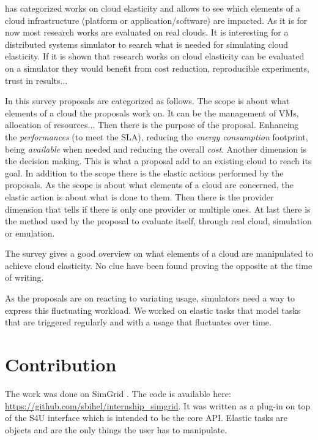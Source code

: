 \documentclass[a4paper, onecolumn]{article}
\begin{document}
  \cite{Naskos2016} has categorized works on cloud elasticity and allows to see
  which elements of a cloud infrastructure (platform or application/software)
  are impacted. As it is for now most research works are evaluated on real
  clouds. It is interesting for a distributed systems simulator to search what
  is needed for simulating cloud elasticity. If it is shown that research works
  on cloud elasticity can be evaluated on a simulator they would benefit from
  cost reduction, reproducible experiments, trust in results...
  
  In this survey proposals are categorized as follows. The scope is about what
  elements of a cloud the proposals work on. It can be the management of VMs,
  allocation of resources... Then there is the purpose of the proposal.
  Enhancing the \textit{performances} (to meet the SLA), reducing the
  \textit{energy consumption} footprint, being \textit{available} when needed
  and reducing the overall \textit{cost}. Another dimension is the decision
  making. This is what a proposal add to an existing cloud to reach its goal. In
  addition to the scope there is the elastic actions performed by the proposals.
  As the scope is about what elements of a cloud are concerned, the elastic
  action is about what is done to them. Then there is the provider dimension
  that tells if there is only one provider or multiple ones. At last there is
  the method used by the proposal to evaluate itself, through real cloud,
  simulation or emulation.
  
  The survey gives a good overview on what elements of a cloud are manipulated
  to achieve cloud elasticity. No clue have been found proving the opposite at
  the time of writing.
  
  As the proposals are on reacting to variating usage, simulators need a way to
  express this fluctuating workload. We worked on elastic tasks that model tasks
  that are triggered regularly and with a usage that fluctuates over time.


\section{Contribution} \label{contrib}
  The work was done on SimGrid \cite{casanova:hal-01017319}. The code is
  available here: \url{https://github.com/sbihel/internship_simgrid}. It was
  written as a plug-in on top of the S4U interface which is intended to be the
  core API. Elastic tasks are objects and are the only things the user has to
  manipulate.
  
\end{document}
